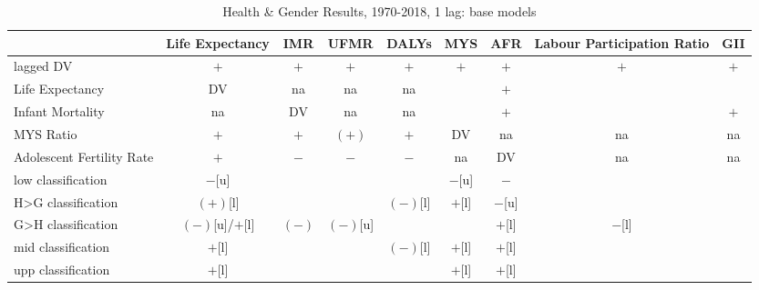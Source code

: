 \documentclass[12pt]{article}
\begin{document}
\begin{table}
\small
\centering
\caption{Health \& Gender Results, 1970-2018, 1 lag: base models}
\label{table_summary}
\begin{tabular}{lcccccccc}
\toprule
                          & Life Expectancy     & IMR                 & UFMR         & DALYs           & MYS      & AFR                           & Labour Participation Ratio     & GII \\
\midrule
lagged DV                 & $+$                 & $+$                 & $+$          & $+$             & $+$      & $+$                           & $+$                            & $+$ \\
Life Expectancy           & DV                  & na                  & na           & na              &          & $+$                           &                                & \\
Infant Mortality          & na                  & DV                  & na           & na              &          & $+$                           &                                & $+$ \\
MYS Ratio                 & $+$                 & $+$                 & $(+)$        & $+$             & DV       & na                            & na                             & na \\
Adolescent Fertility Rate & $+$                 & $-$                 & $-$          & $-$             & na       & DV                            & na                             & na \\
low classification        & $-$[u]              &                     &              &                 & $-$[u]   & $-$                           &                                & \\
H>G classification        & $(+)$[l]            &                     &              & $(-)$[l]        & $+$[l]   & $-$[u]                        &                                & \\
G>H classification        & $(-)$[u]/$+$[l]     & $(-)$               & $(-)$[u]     &                 &          & $+$[l]                        & $-$[l]                         & \\
mid classification        & $+$[l]              &                     &              & $(-)$[l]        & $+$[l]   & $+$[l]                        &                                & \\
upp classification        & $+$[l]              &                     &              &                 & $+$[l]   & $+$[l]                        &                                & \\
\bottomrule
\end{tabular}
\end{table}
\end{document}
